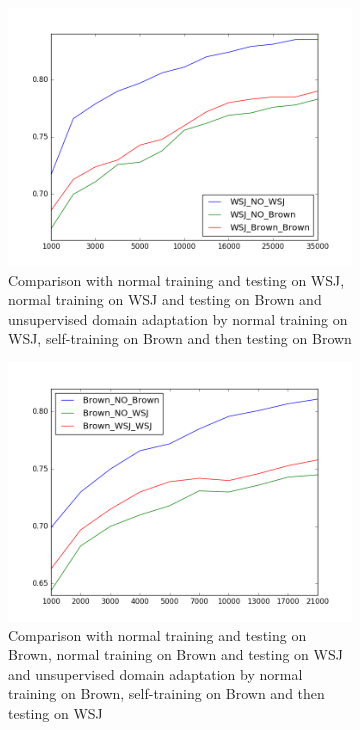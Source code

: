 \documentclass[journal, a4paper]{IEEEtran}
\begin{document}
\begin{figure}
        \begin{subfigure}[b]{0.24\textwidth}
                \includegraphics[width=\linewidth]{plot1}
                \caption{Comparison with normal training and testing on WSJ, normal training on WSJ and testing on Brown and unsupervised domain adaptation by normal training on WSJ, self-training on Brown and then testing on Brown}
                \label{fig:gull}
        \end{subfigure}%
        \hspace{\fill}
        \begin{subfigure}[b]{0.24\textwidth}
                \includegraphics[width=\linewidth]{plot3}
                \caption{Comparison with normal training and testing on Brown, normal training on Brown and testing on WSJ and unsupervised domain adaptation by normal training on Brown, self-training on Brown and then testing on WSJ}
                \label{fig:tiger}
        \end{subfigure}%
        \caption{}\label{plot1}
\vspace{-2mm}
\end{figure}
\end{document}
